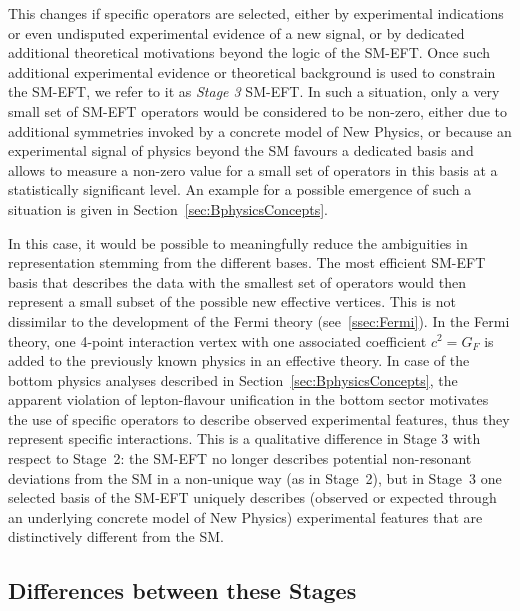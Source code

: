This changes if specific operators are selected, either by
experimental indications or even undisputed experimental evidence of a
new signal, or by dedicated additional theoretical motivations beyond
the logic of the SM-EFT. Once such additional experimental evidence or
theoretical background is used to constrain the SM-EFT, we refer to it
as \emph{Stage 3} SM-EFT.  In such a situation, only a very small set
of SM-EFT operators would be considered to be non-zero, either due to
additional symmetries invoked by a concrete model of New Physics, or
because an experimental signal of physics beyond the SM favours a
dedicated basis and allows to measure a non-zero value for a small set
of operators in this basis at a statistically
significant level. An example for a possible emergence of such a
situation is given in Section~\ref{sec:BphysicsConcepts}.

In this case, it would be possible to meaningfully reduce the
ambiguities in representation stemming from the different bases. The
most efficient SM-EFT basis that describes the data with the
smallest set of operators would then represent a small subset of the
possible new effective vertices.  This is not dissimilar to the
development of the Fermi theory (see~\ref{ssec:Fermi}). In the Fermi
theory, one 4-point interaction vertex with one associated coefficient
$c^2=G_F$ is added to the previously known physics in an effective
theory. In case of the bottom physics analyses described in Section~\ref{sec:BphysicsConcepts}, the apparent
violation of lepton-flavour unification in the bottom sector motivates
the use of specific operators to describe observed experimental
features, thus they represent specific interactions. This is a
qualitative difference in Stage 3 with respect to Stage~2: the SM-EFT
no longer describes potential non-resonant deviations from the
SM in a non-unique way (as in Stage~2), but in Stage~3 one selected basis of
the SM-EFT uniquely describes (observed or expected through an
underlying concrete model of New Physics) experimental features that
are distinctively different from the SM.

\subsection{Differences between these Stages}

